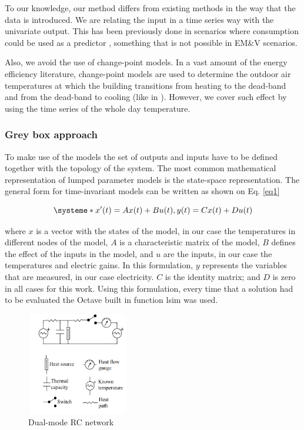 \documentclass[10pt, conference, compsocconf]{IEEEtran}
\begin{document}
To our knowledge, our method differs from existing methods in the way that the data is introduced. We are relating the input in a time series way with the univariate output. This has been previously done in scenarios where consumption could be used as a predictor \cite{ruijin2013building}, something that is not possible in EM\&V scenarios.

Also, we avoid the use of change-point models. In a vast amount of the energy efficiency literature, change-point models are used to determine the outdoor air temperatures at which the building transitions from heating to the dead-band and from the dead-band to cooling (like in \cite{kissock1998ambient}). However, we cover such effect by using the time series of the whole day temperature. 


\subsubsection{ Grey box approach}


To make use of the models the set of outputs and inputs have to be defined together with the topology of the system. 
The most common mathematical representation of lumped parameter models is the state-space representation. The general form for time-invariant models can be written as shown on Eq. \ref{eq1}

\begin{equation}\label{eq1}
\systeme*{x'(t)=Ax(t) + Bu(t), y(t)= Cx(t) + Du(t)}
\end{equation}

where $x$ is a vector with the states of the model, in our case the temperatures in different nodes of the model, $A$ is a characteristic matrix of the model, $B$ defines the effect of the inputs in the model, and $u$ are the inputs, in our case the temperatures and electric gains. In this formulation, $y$ represents the variables that are measured, in our case electricity. $C$ is the identity matrix; and $D$ is zero in all cases for this work. Using this formulation, every time that a solution had to be evaluated the Octave built in function lsim was used.

\begin{figure}[h]%
\centering
\centerline{\includegraphics[width=4.5cm,height=4.5cm,keepaspectratio]{./pics/figAlf.pdf}}
\caption{Dual-mode RC network}\vspace*{-6pt}
  \label{fig:alf}
\end{figure}
\end{document}
